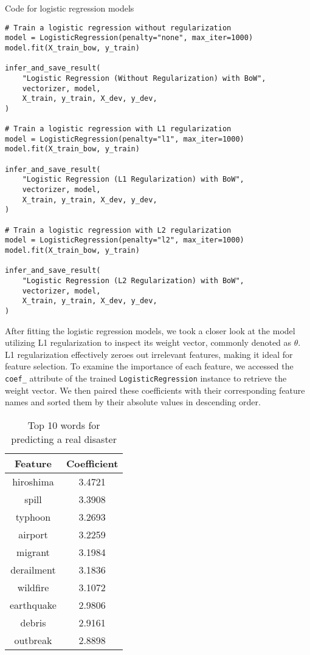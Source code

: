 \documentclass{article}
\begin{document}
\begin{listing}[H]
\caption{Code for logistic regression models}
\label{code:lr-bow}
\begin{verbatim}
# Train a logistic regression without regularization
model = LogisticRegression(penalty="none", max_iter=1000)
model.fit(X_train_bow, y_train)

infer_and_save_result(
    "Logistic Regression (Without Regularization) with BoW",
    vectorizer, model,
    X_train, y_train, X_dev, y_dev,
)

# Train a logistic regression with L1 regularization
model = LogisticRegression(penalty="l1", max_iter=1000)
model.fit(X_train_bow, y_train)

infer_and_save_result(
    "Logistic Regression (L1 Regularization) with BoW",
    vectorizer, model,
    X_train, y_train, X_dev, y_dev,
)

# Train a logistic regression with L2 regularization
model = LogisticRegression(penalty="l2", max_iter=1000)
model.fit(X_train_bow, y_train)

infer_and_save_result(
    "Logistic Regression (L2 Regularization) with BoW",
    vectorizer, model,
    X_train, y_train, X_dev, y_dev,
)
\end{verbatim}
\end{listing}

After fitting the logistic regression models, we took a closer look at the model utilizing L1 regularization to inspect its weight vector, commonly denoted as \(\theta\). L1 regularization effectively zeroes out irrelevant features, making it ideal for feature selection. To examine the importance of each feature, we accessed the \texttt{coef\_} attribute of the trained \texttt{LogisticRegression} instance to retrieve the weight vector. We then paired these coefficients with their corresponding feature names and sorted them by their absolute values in descending order.

\begin{table}[h]
\centering
\begin{tabular}{|c|c|}
\hline
\textbf{Feature} & \textbf{Coefficient} \\
\hline
hiroshima & 3.4721 \\
spill & 3.3908 \\
typhoon & 3.2693 \\
airport & 3.2259 \\
migrant & 3.1984 \\
derailment & 3.1836 \\
wildfire & 3.1072 \\
earthquake & 2.9806 \\
debris & 2.9161 \\
outbreak & 2.8898 \\
\hline
\end{tabular}
\caption{Top 10 words for predicting a real disaster}
\label{table:top-10-words}
\end{table}
\end{document}

